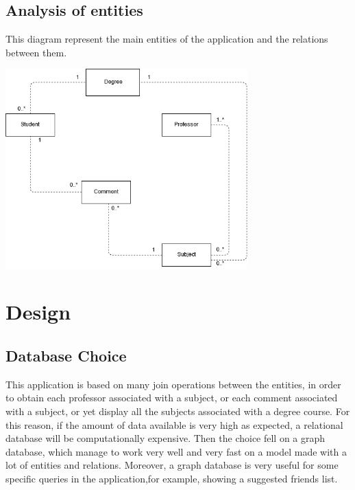 \documentclass[a4paper]{article}
\begin{document}
\subsection{Analysis of entities}
This diagram represent the main entities of the application and the relations between them.
\begin{minipage}{\linewidth}
\begin{center}
\vspace{4mm}
\includegraphics[width = 0.7\textwidth]{./images/diagrams/AnalysisUML.png} 
\vspace{2mm}
\label{fig:analisys_diagram}
\end{center}
\end{minipage}

\clearpage
\section{Design}

\subsection{Database Choice}
This application is based on many join operations between the entities, in order to obtain each professor associated with a subject, or each comment associated with a subject, or yet display all the subjects associated with a degree course. For this reason, if the amount of data available is very high as expected, a relational database will be computationally expensive. Then the choice fell on a graph database, which manage to work very well and very fast on a model made with a lot of entities and relations. Moreover, a graph database is very useful for some specific queries in the application,for example, showing a suggested friends list. \\
\end{document}
